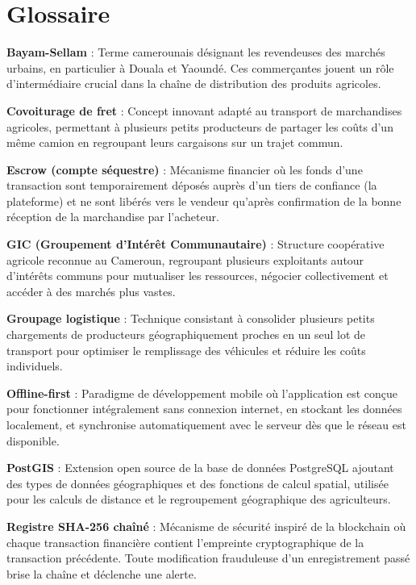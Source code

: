 \documentclass[12pt,a4paper]{report}
\begin{document}
\chapter*{Glossaire}

\textbf{Bayam-Sellam} : Terme camerounais désignant les revendeuses des marchés urbains, en particulier à Douala et Yaoundé. Ces commerçantes jouent un rôle d'intermédiaire crucial dans la chaîne de distribution des produits agricoles.

\medskip
\textbf{Covoiturage de fret} : Concept innovant adapté au transport de marchandises agricoles, permettant à plusieurs petits producteurs de partager les coûts d'un même camion en regroupant leurs cargaisons sur un trajet commun.

\medskip
\textbf{Escrow (compte séquestre)} : Mécanisme financier où les fonds d'une transaction sont temporairement déposés auprès d'un tiers de confiance (la plateforme) et ne sont libérés vers le vendeur qu'après confirmation de la bonne réception de la marchandise par l'acheteur.

\medskip
\textbf{GIC (Groupement d'Intérêt Communautaire)} : Structure coopérative agricole reconnue au Cameroun, regroupant plusieurs exploitants autour d'intérêts communs pour mutualiser les ressources, négocier collectivement et accéder à des marchés plus vastes.

\medskip
\textbf{Groupage logistique} : Technique consistant à consolider plusieurs petits chargements de producteurs géographiquement proches en un seul lot de transport pour optimiser le remplissage des véhicules et réduire les coûts individuels.

\medskip
\textbf{Offline-first} : Paradigme de développement mobile où l'application est conçue pour fonctionner intégralement sans connexion internet, en stockant les données localement, et synchronise automatiquement avec le serveur dès que le réseau est disponible.

\medskip
\textbf{PostGIS} : Extension open source de la base de données PostgreSQL ajoutant des types de données géographiques et des fonctions de calcul spatial, utilisée pour les calculs de distance et le regroupement géographique des agriculteurs.

\medskip
\textbf{Registre SHA-256 chaîné} : Mécanisme de sécurité inspiré de la blockchain où chaque transaction financière contient l'empreinte cryptographique de la transaction précédente. Toute modification frauduleuse d'un enregistrement passé brise la chaîne et déclenche une alerte.
\end{document}
